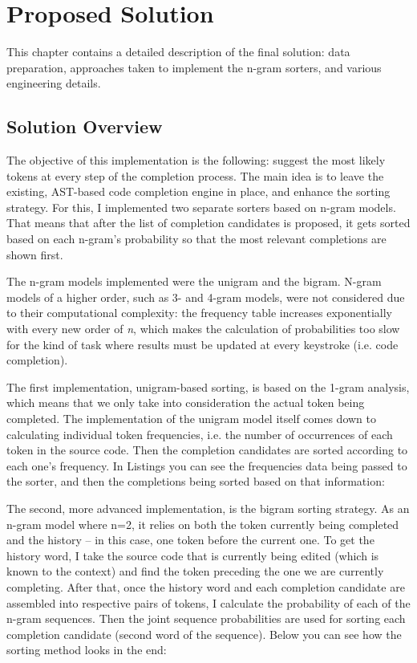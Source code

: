 \documentclass[sigplan,screen]{acmart}
\begin{document}
\section{Proposed Solution}
This chapter contains a detailed description of the final solution: data preparation, approaches taken to implement the n-gram sorters, and various engineering details.

\subsection{Solution Overview}
The objective of this implementation is the following: suggest the most likely tokens at every step of the completion process. The main idea is to leave the existing, AST-based code completion engine in place, and enhance the sorting strategy. For this, I implemented two separate sorters based on n-gram models. That means that after the list of completion candidates is proposed, it gets sorted based on each n-gram's probability so that the most relevant completions are shown first.

The n-gram models implemented were the unigram and the bigram. N-gram models of a higher order, such as 3- and 4-gram models, were not considered due to their computational complexity: the frequency table increases exponentially with every new order of \textit{n}, which makes the calculation of probabilities too slow for the kind of task where results must be updated at every keystroke (i.e. code completion).

The first implementation, unigram-based sorting, is based on the 1-gram analysis, which means that we only take into consideration the actual token being completed. The implementation of the unigram model itself comes down to calculating individual token frequencies, i.e. the number of occurrences of each token in the source code. Then the completion candidates are sorted according to each one's frequency. In Listings you can see the frequencies data being passed to the sorter, and then the completions being sorted based on that information:

The second, more advanced implementation, is the bigram sorting strategy. As an n-gram model where n=2, it relies on both the token currently being completed and the history -- in this case, one token before the current one. To get the history word, I take the source code that is currently being edited (which is known to the context) and find the token preceding the one we are currently completing. After that, once the history word and each completion candidate are assembled into respective pairs of tokens, I calculate the probability of each of the n-gram sequences. Then the joint sequence probabilities are used for sorting each completion candidate (second word of the sequence). Below you can see how the sorting method looks in the end:
\end{document}
